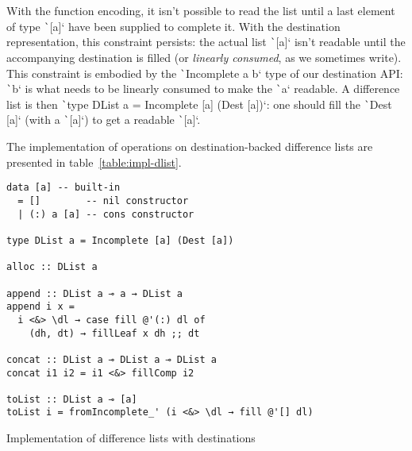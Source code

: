\documentclass[english]{jflart}
\begin{document}
With the function encoding, it isn't possible to read the list until a last element of type \texttt`[a]` have been supplied to complete it. With the destination representation, this constraint persists: the actual list \texttt`[a]` isn't readable until the accompanying destination is filled (or \emph{linearly consumed}, as we sometimes write). This constraint is embodied by the \texttt`Incomplete a b` type of our destination API: \texttt`b` is what needs to be linearly consumed to make the \texttt`a` readable. A difference list is then \texttt`type DList a = Incomplete [a] (Dest [a])`: one should fill the \texttt`Dest [a]` (with a \texttt`[a]`) to get a readable \texttt`[a]`.

The implementation of operations on destination-backed difference lists are presented in table~\ref{table:impl-dlist}.
\begin{table}[t]
\small
\begin{verbatim}
data [a] -- built-in
  = []        -- nil constructor
  | (:) a [a] -- cons constructor

type DList a = Incomplete [a] (Dest [a])

alloc :: DList a

append :: DList a ⊸ a → DList a
append i x =
  i <&> \dl → case fill @'(:) dl of
    (dh, dt) → fillLeaf x dh ;; dt

concat :: DList a ⊸ DList a ⊸ DList a
concat i1 i2 = i1 <&> fillComp i2

toList :: DList a ⊸ [a]
toList i = fromIncomplete_' (i <&> \dl → fill @'[] dl)
\end{verbatim}
\caption{Implementation of difference lists with destinations}
\label{table:impl-dlist}
\end{table}
\end{document}

